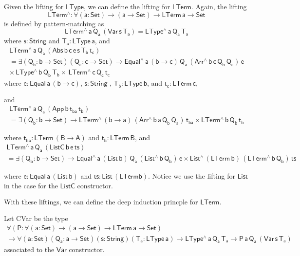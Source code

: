 \documentclass[acmsmall,screen,review,anonymous]{acmart}
\theoremstyle{definition}
\begin{document}
Given the lifting for $\mathsf{LType}$, we can define the lifting for $\mathsf{LTerm}$. Again, 
the lifting 
\[
\mathsf{LTerm^{\wedge} : \forall (a : Set) \to (a \to Set) \to LTerm\,a \to Set}
\]
is defined by pattern-matching as
\[
  \mathsf{LTerm^{\wedge}\,a\,Q_a\,(Var\,s\,T_a) = LType^{\wedge}\, a\, Q_a\, T_a}
\]
where $\mathsf{s : String}$ and $\mathsf{T_a : LType\, a}$,  and 
\begin{multline*}
  \mathsf{LTerm^{\wedge}\,a\,Q_a\,
  (Abs \,b \,c \,e \,s \,T_b \,t_c)} \\ 
\mathsf{
  = \exists (Q_b : b \to Set) (Q_c : c \to Set) \to
      Equal^{\wedge} \, a\, (b \to c)\, Q_a\, (Arr^{\wedge} \, b\, c\, Q_b \, Q_c)\, e} \\ 
\mathsf{
      \times \, LType^{\wedge}\, b\, Q_b\, T_b
      \times \, LTerm^{\wedge}\, c\, Q_c\, t_c }
\end{multline*}
where $\mathsf{e : Equal \, a \, (b \to c)}$, $\mathsf{s : String}$ , $\mathsf{T_b : LType\,b}$, and $\mathsf{t_c : LTerm \, c}$,

and 
\begin{multline*}
  \mathsf{LTerm^{\wedge}\,a\,Q_a\, (App\, b\, t_{ba}\, t_b)} \\ 
\mathsf{
  = \exists (Q_b : b \to Set) \to 
      LTerm^{\wedge}\, (b \to a)\, (Arr^{\wedge} \, b\, a\, Q_b \, Q_a)\, t_{ba}
      \times LTerm^{\wedge}\, b\, Q_b\, t_b }
\end{multline*}

where $\mathsf{t_{ba} : LTerm \, (B \to A)}$ and $\mathsf{t_b : LTerm \, B}$, and
\begin{multline*}
  \mathsf{LTerm^{\wedge}\,a\,Q_a\, (ListC\, b\, e\, ts)} \\ 
\mathsf{
  = \exists (Q_b : b \to Set) \to 
      Equal^{\wedge} \, a\, (List\,b)\, Q_a\, (List^{\wedge} \, b\, Q_b) \, e
      \times List^{\wedge}\, (LTerm\,b) \, (LTerm^{\wedge} \, b\, Q_b) \, ts
    }
\end{multline*}

where $\mathsf{e : Equal\, a\, (List \,b)}$ and $\mathsf{ts : List\, (LTerm b)}$. 
Notice we use the lifting for $\mathsf{List}$ in the case for the $\mathsf{ListC}$ constructor. 


With these liftings, we can define the deep induction princple for $\mathsf{LTerm}$.


Let CVar be the type 
\begin{multline*}
\mathsf{\forall (P : \forall (a : Set) \to (a \to Set) \to LTerm\,a \to Set)} \\
\mathsf{\to 
  \forall (a : Set) (Q_a : a \to Set) (s : String) (T_a : LType\, a) 
  \to LType^{\wedge} \, a\, Q_a\, T_a
  \to P \, a\, Q_a\, (Var \, s\, T_a)
  }
\end{multline*}
associated to the $\mathsf{Var}$ constructor. 
\end{document}
